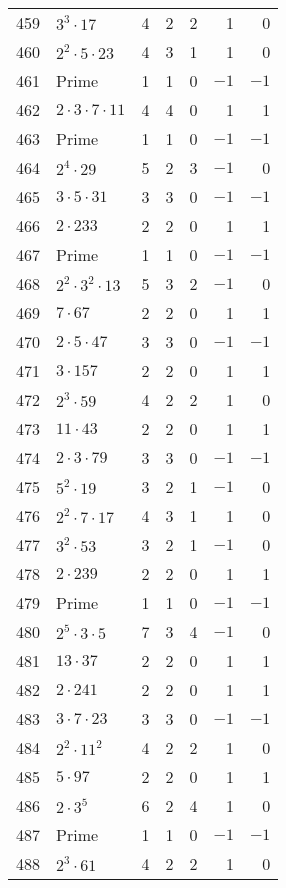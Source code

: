 \documentclass[12pt]{article}
\begin{document}
\begin{tabular}{|r|l|r|r|r|r|r|}
459 & $3^3 \cdot 17$ & 4 & 2 & 2 & 1 & 0 \\
460 & $2^2 \cdot 5 \cdot 23$ & 4 & 3 & 1 & 1 & 0 \\
461 & Prime & 1 & 1 & 0 & $-1$ & $-1$ \\
462 & $2 \cdot 3 \cdot 7 \cdot 11$ & 4 & 4 & 0 & 1 & 1 \\
463 & Prime & 1 & 1 & 0 & $-1$ & $-1$ \\
464 & $2^4 \cdot 29$ & 5 & 2 & 3 & $-1$ & 0 \\
465 & $3 \cdot 5 \cdot 31$ & 3 & 3 & 0 & $-1$ & $-1$ \\
466 & $2 \cdot 233$ & 2 & 2 & 0 & 1 & 1 \\
467 & Prime & 1 & 1 & 0 & $-1$ & $-1$ \\
468 & $2^2 \cdot 3^2 \cdot 13$ & 5 & 3 & 2 & $-1$ & 0 \\
469 & $7 \cdot 67$ & 2 & 2 & 0 & 1 & 1 \\
470 & $2 \cdot 5 \cdot 47$ & 3 & 3 & 0 & $-1$ & $-1$ \\
471 & $3 \cdot 157$ & 2 & 2 & 0 & 1 & 1 \\
472 & $2^3 \cdot 59$ & 4 & 2 & 2 & 1 & 0 \\
473 & $11 \cdot 43$ & 2 & 2 & 0 & 1 & 1 \\
474 & $2 \cdot 3 \cdot 79$ & 3 & 3 & 0 & $-1$ & $-1$ \\
475 & $5^2 \cdot 19$ & 3 & 2 & 1 & $-1$ & 0 \\
476 & $2^2 \cdot 7 \cdot 17$ & 4 & 3 & 1 & 1 & 0 \\
477 & $3^2 \cdot 53$ & 3 & 2 & 1 & $-1$ & 0 \\
478 & $2 \cdot 239$ & 2 & 2 & 0 & 1 & 1 \\
479 & Prime & 1 & 1 & 0 & $-1$ & $-1$ \\
480 & $2^5 \cdot 3 \cdot 5$ & 7 & 3 & 4 & $-1$ & 0 \\
481 & $13 \cdot 37$ & 2 & 2 & 0 & 1 & 1 \\
482 & $2 \cdot 241$ & 2 & 2 & 0 & 1 & 1 \\
483 & $3 \cdot 7 \cdot 23$ & 3 & 3 & 0 & $-1$ & $-1$ \\
484 & $2^2 \cdot 11^2$ & 4 & 2 & 2 & 1 & 0 \\
485 & $5 \cdot 97$ & 2 & 2 & 0 & 1 & 1 \\
486 & $2 \cdot 3^5$ & 6 & 2 & 4 & 1 & 0 \\
487 & Prime & 1 & 1 & 0 & $-1$ & $-1$ \\
488 & $2^3 \cdot 61$ & 4 & 2 & 2 & 1 & 0 \\

\end{tabular}
\end{document}
